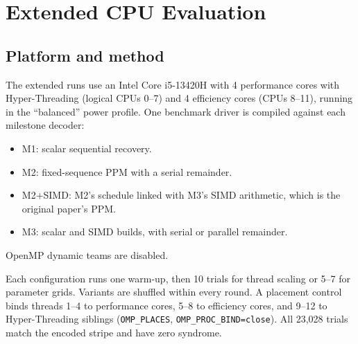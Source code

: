 \documentclass[conference]{IEEEtran}
\begin{document}
\section{Extended CPU Evaluation}
\subsection{Platform and method}
\label{sec:ext-platform}
The extended runs use an Intel Core i5-13420H with 4 performance cores with Hyper-Threading (logical CPUs 0--7) and 4 efficiency cores (CPUs 8--11), running in the ``balanced'' power profile. One benchmark driver is compiled against each milestone decoder:
\begin{itemize}
\item M1: scalar sequential recovery.
\item M2: fixed-sequence PPM with a serial remainder.
\item M2+SIMD: M2's schedule linked with M3's SIMD arithmetic, which is the original paper's PPM.
\item M3: scalar and SIMD builds, with serial or parallel remainder.
\end{itemize}
OpenMP dynamic teams are disabled.

Each configuration runs one warm-up, then 10 trials for thread scaling or 5--7 for parameter grids. Variants are shuffled within every round. A placement control binds threads 1--4 to performance cores, 5--8 to efficiency cores, and 9--12 to Hyper-Threading siblings (\texttt{OMP\_PLACES}, \texttt{OMP\_PROC\_BIND=close}). All 23,028 trials match the encoded stripe and have zero syndrome.
\end{document}
